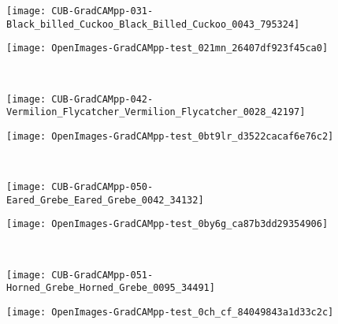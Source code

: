\documentclass[twocolumn]{article}
\theoremstyle{definition}
\begin{document}
\begin{figure*}
     \begin{subfigure}[b]{0.49\textwidth}
         \centering
         \texttt{[image: CUB-GradCAMpp-031-Black\_billed\_Cuckoo\_Black\_Billed\_Cuckoo\_0043\_795324]}
     \end{subfigure}
     \hfill
     \begin{subfigure}[b]{0.49\textwidth}
         \centering
         \texttt{[image: OpenImages-GradCAMpp-test\_021mn\_26407df923f45ca0]}
     \end{subfigure}
     \\
     \vspace{0.1cm}
     \begin{subfigure}[b]{0.49\textwidth}
         \centering
         \texttt{[image: CUB-GradCAMpp-042-Vermilion\_Flycatcher\_Vermilion\_Flycatcher\_0028\_42197]}
     \end{subfigure}
     \hfill
     \begin{subfigure}[b]{0.49\textwidth}
         \centering
         \texttt{[image: OpenImages-GradCAMpp-test\_0bt9lr\_d3522cacaf6e76c2]}
     \end{subfigure}
      \\
     \vspace{0.1cm}
     \begin{subfigure}[b]{0.49\textwidth}
         \centering
         \texttt{[image: CUB-GradCAMpp-050-Eared\_Grebe\_Eared\_Grebe\_0042\_34132]}
     \end{subfigure}
     \hfill
     \begin{subfigure}[b]{0.49\textwidth}
         \centering
         \texttt{[image: OpenImages-GradCAMpp-test\_0by6g\_ca87b3dd29354906]}
     \end{subfigure}
      \\
     \vspace{0.1cm}
     \begin{subfigure}[b]{0.49\textwidth}
         \centering
         \texttt{[image: CUB-GradCAMpp-051-Horned\_Grebe\_Horned\_Grebe\_0095\_34491]}
     \end{subfigure}
     \hfill
     \begin{subfigure}[b]{0.49\textwidth}
         \centering
         \texttt{[image: OpenImages-GradCAMpp-test\_0ch\_cf\_84049843a1d33c2c]}
     \end{subfigure}
      \\
     \vspace{0.1cm}
     \begin{subfigure}[b]{0.49\textwidth}

\end{subfigure}
\end{figure*}
\end{document}

